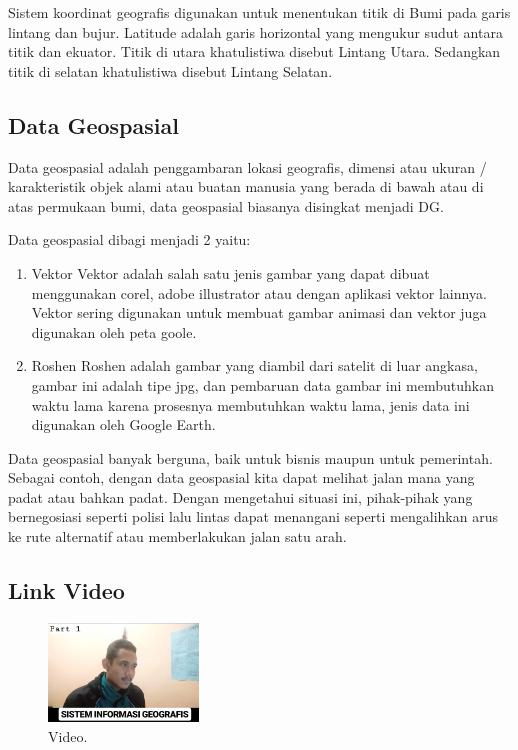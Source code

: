 Sistem koordinat geografis digunakan untuk menentukan titik di Bumi pada garis lintang dan bujur.
Latitude adalah garis horizontal yang mengukur sudut antara titik dan ekuator. Titik di utara khatulistiwa disebut Lintang Utara. Sedangkan titik di selatan khatulistiwa disebut Lintang Selatan. \hfill\break


\subsection {Data Geospasial}
Data geospasial adalah penggambaran lokasi geografis, dimensi atau ukuran / karakteristik objek alami atau buatan manusia yang berada di bawah atau di atas permukaan bumi, data geospasial biasanya disingkat menjadi DG.\hfill\break

Data geospasial dibagi menjadi 2 yaitu:

\begin{enumerate}
	\item Vektor \hfill\break
Vektor adalah salah satu jenis gambar yang dapat dibuat menggunakan corel, adobe illustrator atau dengan aplikasi vektor lainnya. Vektor sering digunakan untuk membuat gambar animasi dan vektor juga digunakan oleh peta goole.
	\item Roshen \hfill\break
Roshen adalah gambar yang diambil dari satelit di luar angkasa, gambar ini adalah tipe jpg, dan pembaruan data gambar ini membutuhkan waktu lama karena prosesnya membutuhkan waktu lama, jenis data ini digunakan oleh Google Earth. 
\end{enumerate}

Data geospasial banyak berguna, baik untuk bisnis maupun untuk pemerintah.
Sebagai contoh, dengan data geospasial kita dapat melihat jalan mana yang padat atau bahkan padat. Dengan mengetahui situasi ini, pihak-pihak yang bernegosiasi seperti polisi lalu lintas dapat menangani seperti mengalihkan arus ke rute alternatif atau memberlakukan jalan satu arah. \hfill\break

\subsection{Link Video}

\begin{figure}[H]
	\includegraphics[width=4cm]{figures/1174021/2.png}
	\centering
	\caption{Video.}
\end{figure}

